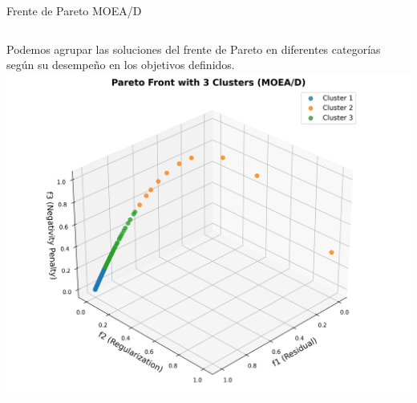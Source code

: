 \documentclass[aspectratio=169,xcolor=dvipsnames]{beamer}
\begin{document}
\begin{frame}{Frente de Pareto MOEA/D}
    \begin{columns}
        \justifying
        Podemos agrupar las soluciones del frente de Pareto en diferentes categorías según su desempeño en los objetivos definidos.
        \centering
        \includegraphics[width=\textwidth]{img/pareto_clustering_moead.png} %
    \end{columns}
\end{frame}
\end{document}
